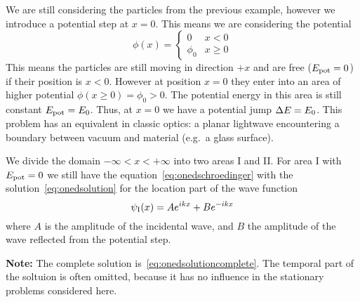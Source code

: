 \documentclass[../../script.tex]{subfiles}
\begin{document}
We are still considering the particles from the previous example, however we introduce a potential step at $x = 0$. This means we are considering the potential 
\[
	\phi(x) = \begin{cases}
		0 & x < 0 \\
		\phi_0 & x \ge 0
	\end{cases}
\]
This means the particles are still moving in direction $+x$ and are free ($E_{\text{pot}} = 0$) if their position is $x < 0$. However at position $x = 0$ they enter into an area of higher potential $\phi(x \ge 0) = \phi_0 > 0$.
The potential energy in this area is still constant $E_{\text{pot}} = E_{\text{0}}$. Thus, at $x = 0$ we have a potential jump $\Delta E = E_{\text{0}}$.
This problem has an equivalent in classic optics: a planar lightwave encountering a boundary between vacuum and material (e.g.\ a glass surface).

We divide the domain $-\infty < x < +\infty$ into two areas I and II\@. For area I with $E_{\text{pot}} = 0$ we still have the equation~\eqref{eq:onedschroedinger} with the solution~\eqref{eq:onedsolution}
for the location part of the wave function 
\[
	\wave[I](x) = Ae^{ikx} + Be^{-ikx}
\]
where $A$ is the amplitude of the incidental wave, and $B$ the amplitude of the wave reflected from the potential step.

\textbf{Note:} The complete solution is~\eqref{eq:onedsolutioncomplete}. The temporal part of the soltuion is often omitted, because it has no influence in the stationary problems considered here.
\end{document}
